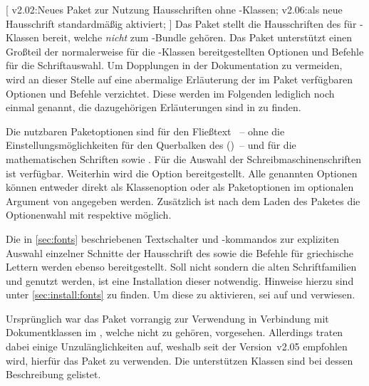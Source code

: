 \begin{DeclareEntity}{}
[
  v2.02:Neues Paket zur Nutzung Hausschriften ohne \TUDScript-Klassen;
  v2.06:\OpenSans als neue Hausschrift standardmäßig aktiviert;
]
Das Paket  stellt die Hausschriften des \TUDCDs für 
-Klassen bereit, welche \emph{nicht} zum \TUDScript-Bundle 
gehören. Das Paket unterstützt einen Großteil der normalerweise für die 
\TUDScript-Klassen bereitgestellten Optionen und Befehle für die 
Schriftauswahl. Um Dopplungen in der Dokumentation zu vermeiden, wird an dieser 
Stelle auf eine abermalige Erläuterung der im Paket  
verfügbaren Optionen und Befehle verzichtet. Diese werden im Folgenden 
lediglich noch einmal genannt, die dazugehörigen Erläuterungen sind in 
 zu finden.

Die nutzbaren Paketoptionen sind für den Fließtext ~-- ohne die 
Einstellungsmöglichkeiten für den Querbalken des \CDs ()~-- und 
für die mathematischen Schriften  sowie . 
Für die Auswahl der Schreibmaschinenschriften ist  verfügbar. 
Weiterhin wird die Option  bereitgestellt. Alle genannten 
Optionen können entweder direkt als Klassenoption oder als Paketoptionen im 
optionalen Argument von 
 angegeben 
werden. Zusätzlich ist nach dem Laden des Paketes die Optionenwahl mit 
 respektive  möglich.

Die in \autoref{sec:fonts} beschriebenen Textschalter und -kommandos zur 
expliziten Auswahl einzelner Schnitte der Hausschrift des \CDs sowie die 
Befehle für griechische Lettern werden ebenso bereitgestellt.
%
Soll nicht \OpenSans sondern die alten Schriftfamilien \Univers und \DIN 
genutzt werden, ist eine Installation dieser notwendig. Hinweise hierzu sind 
unter \autoref{sec:install:fonts} zu finden. Um diese zu aktivieren, sei auf 
 und  verwiesen.

%
Ursprünglich war das Paket  vorrangig zur Verwendung in 
Verbindung mit Dokumentklassen im \TUDCD, welche nicht zu \TUDScript gehören, 
vorgesehen. Allerdings traten dabei einige Unzulänglichkeiten auf, weshalb seit 
der Version~v2.05 empfohlen wird, hierfür das Paket  
zu verwenden. Die unterstützen Klassen sind bei dessen Beschreibung gelistet. 
\end{DeclareEntity}



